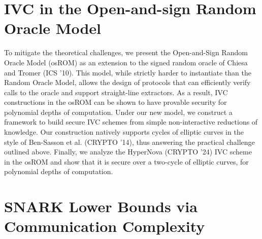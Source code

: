 \documentclass[11pt,oneside]{book}
\theoremstyle{definition}
\theoremstyle{remark}
\theoremstyle{plain}
\begin{document}
\section{\cite{cryptoeprint:2025/1663} IVC in the Open-and-sign Random Oracle Model}
To mitigate the theoretical challenges, we present the Open-and-Sign Random Oracle Model (osROM) as an extension to the signed random oracle of Chiesa and Tromer (ICS '10). This model, while strictly harder to instantiate than the Random Oracle Model, allows the design of protocols that can efficiently verify calls to the oracle and support straight-line extractors. As a result, IVC constructions in the osROM can be shown to have provable security for polynomial depths of computation. Under our new model, we construct a framework to build secure IVC schemes from simple non-interactive reductions of knowledge. Our construction natively supports cycles of elliptic curves in the style of Ben-Sasson et al. (CRYPTO '14), thus answering the practical challenge outlined above. Finally, we analyze the HyperNova (CRYPTO '24) IVC scheme in the osROM and show that it is secure over a two-cycle of elliptic curves, for polynomial depths of computation.

\section{\cite{cryptoeprint:2025/1698} SNARK Lower Bounds via Communication Complexity}
\end{document}
